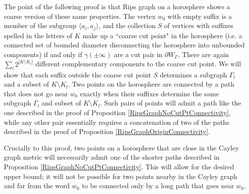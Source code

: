 \documentclass{amsart}
\theoremstyle{definition}
\theoremstyle{remark}
\begin{document}
    The point of the following proof is that Rips graph on a horosphere shows a coarse version of these same properties. The vertex $w_0$ with empty suffix is a member of the subgroup $\langle a_i, a_j\rangle$, and the collection $S$ of vertices with suffixes spelled in the letters of $K$ make up a ``coarse cut point"  in the horosphere (i.e. a connected set of bounded diameter disconnecting the horosphere into unbounded components) if and only if $\gamma(\pm\infty)$ are a cut pair in $\partial W_\Gamma$. There are again $\sum_l 2^{|K\setminus K_l|}$ different complementary components to the coarse cut point. We will show that each suffix outside the coarse cut point $S$ determines a subgraph $\Gamma_l$ and a subset of $K\setminus K_l$. Two points on the horosphere are connected by a path that does not go near $w_0$ exactly when their suffixes determine the same subgraph $\Gamma_l$ and subset of $K\setminus K_l$. Such pairs of points will admit a path like the one described in the proof of Proposition \ref{RipsGraphNoCutPtConnectivity}, while any other pair essentially requires a concatenation of two of the paths described in the proof of Proposition \ref{RipsGraphOriginConnectivity}.

    Crucially to this proof, two points on a horosphere that are close in the Cayley graph metric will necessarily admit one of the shorter paths described in Proposition \ref{RipsGraphNoCutPtConnectivity}. This will allow for the desired upper bound; it will not be possible for two points nearby in the Cayley graph and far from the word $w_0$ to be connected only by a long path that goes near $w_0$.
	
\end{document}
